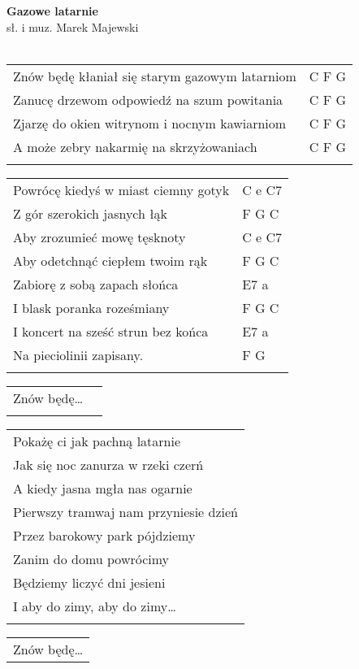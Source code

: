 \documentclass[a5paper]{article}
\begin{document}


\noindent
\fontsize{12pt}{15pt}\selectfont
\textbf{Gazowe latarnie} \\
\fontsize{8pt}{10pt}\selectfont
sł. i muz. Marek Majewski \\ \\
\fontsize{10pt}{12pt}\selectfont
{}
\begin{tabular}{@{}p{9.00cm}p{3cm}@{}}
\noindent
Znów będę kłaniał się starym gazowym latarniom & C F G \\
Zanucę drzewom odpowiedź na szum powitania & C F G \\
Zjarzę do okien witrynom i nocnym kawiarniom & C F G \\
A może zebry nakarmię na skrzyżowaniach & C F G \\ \\
\end{tabular}

\noindent
\begin{tabular}{@{}p{8.00cm}p{3cm}@{}}
Powrócę kiedyś w miast ciemny gotyk & C e C7 \\
Z gór szerokich jasnych łąk & F G C \\
Aby zrozumieć mowę tęsknoty & C e C7 \\
Aby odetchnąć ciepłem twoim rąk & F G C \\
Zabiorę z sobą zapach słońca & E7 a \\
I blask poranka roześmiany & F G C \\
I koncert na sześć strun bez końca & E7 a \\
Na pieciolinii zapisany. & F G \\ \\
\end{tabular}

\noindent
\begin{tabular}{@{}p{8.00cm}p{3cm}@{}}
Znów będę… \\ \\
\end{tabular}

\noindent
\begin{tabular}{@{}p{9.00cm}@{}}
Pokażę ci jak pachną latarnie \\
Jak się noc zanurza w rzeki czerń \\
A kiedy jasna mgła nas ogarnie \\
Pierwszy tramwaj nam przyniesie dzień \\
Przez barokowy park pójdziemy \\
Zanim do domu powrócimy \\
Będziemy liczyć dni jesieni \\
I aby do zimy, aby do zimy… \\ \\
\end{tabular}

\noindent
\begin{tabular}{@{}p{8.00cm}@{}}
Znów będę…
\end{tabular}
\end{document}
